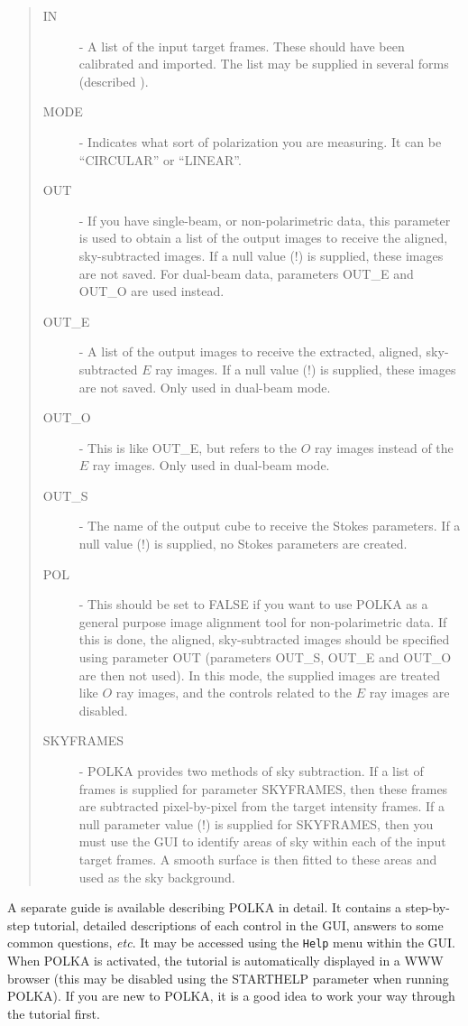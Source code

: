 \documentclass[twoside,11pt]{starlink}
\begin{document}
\begin{quote}
\begin{description}
\item [IN]	- A list of the input target frames. These should have been
calibrated and imported. The list may be supplied in several forms
(described ).
\item [MODE]	- Indicates what sort of polarization you are measuring. It
can be ``CIRCULAR'' or ``LINEAR''.
\item [OUT]	- If you have single-beam, or non-polarimetric data, this
parameter is used to obtain a list of the output images to receive the
aligned, sky-subtracted images. If a null value (!) is supplied, these
images are not saved. For dual-beam data, parameters OUT\_E and OUT\_O
are used instead.
\item [OUT\_E]	- A list of the output images to receive the extracted,
aligned, sky-subtracted $E$ ray images. If a null value (!) is supplied,
these images are not saved. Only used in dual-beam mode.
\item [OUT\_O]	- This is like OUT\_E, but refers to the $O$ ray images
instead of the $E$ ray images. Only used in dual-beam mode.
\item [OUT\_S]	- The name of the output cube to receive the Stokes
parameters. If a null value (!) is supplied, no Stokes parameters are
created.
\item [POL]	- This should be set to FALSE if you want to use POLKA as a
general purpose image alignment tool for non-polarimetric data. If this
is done, the aligned, sky-subtracted images should be specified using parameter
OUT (parameters OUT\_S, OUT\_E and OUT\_O are then not used). In this mode,
the supplied images are treated like $O$ ray images, and the controls
related to the $E$ ray images are disabled.
\item [SKYFRAMES] - POLKA provides two methods of sky subtraction. If a
list of frames is supplied for parameter SKYFRAMES, then these frames are
subtracted pixel-by-pixel from the target intensity frames. If a null
parameter value (!) is supplied for SKYFRAMES, then you must use the GUI to
identify areas of sky within each of the input target frames. A smooth
surface is then fitted to these areas and used as the sky background.

\end{description}
\end{quote}

A separate guide is available describing POLKA in detail. It
contains a step-by-step tutorial, detailed descriptions of
each control in the GUI, answers to some common questions, \emph{etc}. It may be
accessed using the \verb+Help+ menu within the GUI. When POLKA is
activated, the tutorial is automatically displayed in a WWW browser (this
may be disabled using the STARTHELP parameter when running POLKA). If you
are new to POLKA, it is  a good idea to work your way through the
tutorial first.
\end{document}

